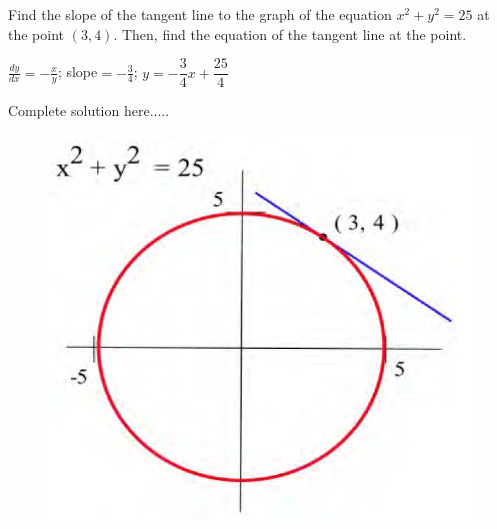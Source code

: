 \begin{example}
Find the slope of the tangent line to the graph of the equation $x^2+y^2=25$ at the point $(3,4)$.   Then, find the equation of the tangent line at the point.
    \begin{sol}
    $\displaystyle\frac{dy}{dx}=-\displaystyle\frac{x}{y}$; slope$=-\displaystyle\frac{3}{4}$; $y=-\dfrac{3}{4}x+\dfrac{25}{4}$
    \end{sol}
    \begin{solL}
    Complete solution here.....
    
    \end{solL}
    
\end{example}
\begin{figure}[h!]
 \flushleft
    \includegraphics[scale=0.35]{images//implicitDiff/implicitCircle.png}
    \end{figure}
\newpage

